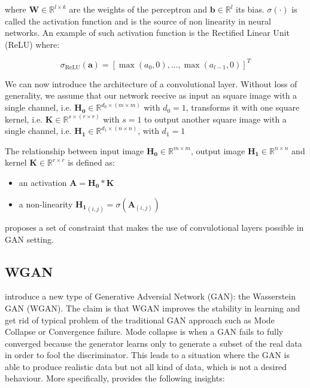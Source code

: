 \documentclass[11pt,a4paper,twoside]{report}
\begin{document}
where $\mathbf{W} \in \mathbb{R}^{l \times k}$ are the weights of the perceptron and $\mathbf{b} \in \mathbb{R}^l$ its bias. $\sigma(\cdot)$ is called the activation function and is the source of non linearity in neural networks. An example of such activation function is the Rectified Linear Unit (ReLU) where:

\begin{equation}
    \sigma_{\text{ReLU}}(\mathbf{a}) = [\max(a_0, 0), \dots, \max(a_{l-1}, 0)]^T
\end{equation}

We can now introduce the architecture of a convolutional layer. Without loss of generality, we assume that our network reecive as input an square image with a single channel, i.e. $\mathbf{H_0} \in \mathbb{R}^{d_0 \times (m \times m)}$ with $d_0 = 1$, transforms it with one square kernel, i.e. $\mathbf{K} \in \mathbb{R}^{s \times (r \times r)}$ with $s = 1$ to output another square image with a single channel, i.e. $\mathbf{H_1} \in \mathbb{R}^{d_1 \times (n \times n)}$, with $d_1 = 1$

The relationship between input image $\mathbf{H_0} \in \mathbb{R}^{m \times m}$, output image $\mathbf{H_1} \in \mathbb{R}^{n \times n}$ and kernel $\mathbf{K} \in \mathbb{R}^{r \times r}$ is defined as:


\begin{itemize} 
    \item an activation $\mathbf{A} = \mathbf{H_0} \ast \mathbf{K}$
    \item a non-linearity $\mathbf{H_1}_{(i,j)} = \sigma(\mathbf{A}_{(i,j)})$ 
\end{itemize}

\cite{radford2015unsupervised} proposes a set of constraint that makes the use of convulotional layers possible in GAN setting.


\subsection{WGAN}

\cite{arjovsky2017wasserstein} introduce a new type of Generative Adversial Network (GAN): the Wasserstein GAN (WGAN). The claim is that WGAN improves the stability in learning and get rid of typical problem of the traditional GAN approach such as Mode Collapse or Convergence failure. Mode collapse is when a GAN fails to fully converged because the generator learns only to generate a subset of the real data in order to fool the discriminator. This leads to a situation where the GAN is able to produce realistic data but not all kind of data, which is not a desired behaviour. More specifically, \cite{arjovsky2017wasserstein} provides the following insights:
\end{document}
